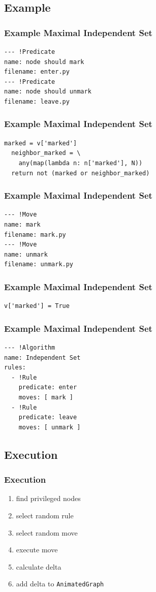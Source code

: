 \documentclass[
]{beamer}
\begin{document}
\subsection{Example}
\begin{frame}[fragile]
  \frametitle{Example \Dash Maximal Independent Set}
\begin{lstlisting}[style=myyaml]
--- !Predicate
name: node should mark
filename: enter.py
--- !Predicate
name: node should unmark
filename: leave.py
\end{lstlisting}
\end{frame}
\begin{frame}[fragile]
  \frametitle{Example \Dash Maximal Independent Set}
  \vspace{1ex}
\begin{lstlisting}[style=mypy]
  marked = v['marked']
  neighbor_marked = \
    any(map(lambda n: n['marked'], N))
  return not (marked or neighbor_marked)
\end{lstlisting}

\end{frame}
\begin{frame}[fragile]
  \frametitle{Example \Dash Maximal Independent Set}
\begin{lstlisting}[style=myyaml]
--- !Move
name: mark
filename: mark.py
--- !Move
name: unmark
filename: unmark.py
\end{lstlisting}
\end{frame}
\begin{frame}[fragile]
  \frametitle{Example \Dash Maximal Independent Set}
  \vspace{1ex}
\begin{lstlisting}[style=mypy]
  v['marked'] = True
\end{lstlisting}
\end{frame}

\begin{frame}[fragile]
  \frametitle{Example \Dash Maximal Independent Set}
\begin{lstlisting}[style=myyaml]
--- !Algorithm
name: Independent Set
rules:
  - !Rule
    predicate: enter
    moves: [ mark ]
  - !Rule
    predicate: leave
    moves: [ unmark ]
\end{lstlisting}
\end{frame}

\subsection{Execution}
\begin{frame}
  \frametitle{Execution}
  \begin{enumerate}[<+->]
  \item find privileged nodes
  \item select random rule
  \item select random move
  \item execute move
  \item calculate delta
  \item add delta to \texttt{AnimatedGraph}
  \end{enumerate}
\end{frame}
\end{document}
